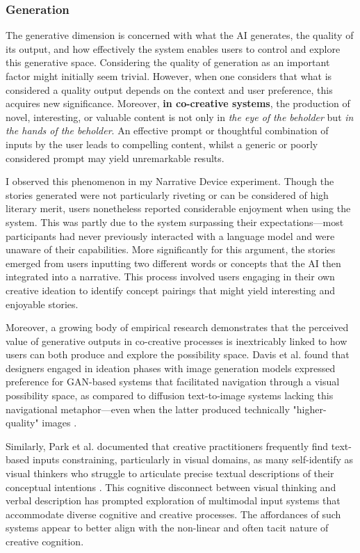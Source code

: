 \subsubsection{Generation}

The generative dimension is concerned with what the AI generates, the quality of its output, and how effectively the system enables users to control and explore this generative space. Considering the quality of generation as an important factor might initially seem trivial. However, when one considers that what is considered a quality output depends on the context and user preference, this acquires new significance. Moreover, \textbf{in co-creative systems}, the production of novel, interesting, or valuable content is not only in \textit{the eye of the beholder} but \textit{in the hands of the beholder}. An effective prompt or thoughtful combination of inputs by the user leads to compelling content, whilst a generic or poorly considered prompt may yield unremarkable results.

I observed this phenomenon in my Narrative Device experiment. Though the stories generated were not particularly riveting or can be considered of high literary merit, users nonetheless reported considerable enjoyment when using the system. This was partly due to the system surpassing their expectations—most participants had never previously interacted with a language model and were unaware of their capabilities. More significantly for this argument, the stories emerged from users inputting two different words or concepts that the AI then integrated into a narrative. This process involved users engaging in their own creative ideation to identify concept pairings that might yield interesting and enjoyable stories.

Moreover, a growing body of empirical research demonstrates that the perceived value of generative outputs in co-creative processes is inextricably linked to how users can both produce and explore the possibility space. Davis et al. found that designers engaged in ideation phases with image generation models expressed preference for GAN-based systems that facilitated navigation through a visual possibility space, as compared to diffusion text-to-image systems lacking this navigational metaphor—even when the latter produced technically "higher-quality" images \cite{Davis2024-ml}. 

Similarly, Park et al. documented that creative practitioners frequently find text-based inputs constraining, particularly in visual domains, as many self-identify as visual thinkers who struggle to articulate precise textual descriptions of their conceptual intentions \cite{Park2024-gw}. This cognitive disconnect between visual thinking and verbal description has prompted exploration of multimodal input systems that accommodate diverse cognitive and creative processes. The affordances of such systems appear to better align with the non-linear and often tacit nature of creative cognition.

